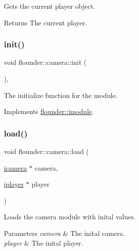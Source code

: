 Gets the current player object. 

\begin{DoxyReturn}{Returns}
The current player. 
\end{DoxyReturn}
\mbox{\label{classflounder_1_1camera_a3deb0358c2a67ad864a630adaf566c4e}} 
\subsubsection{\texorpdfstring{init()}{init()}}
{\footnotesize\ttfamily void flounder\+::camera\+::init (\begin{DoxyParamCaption}{ }\end{DoxyParamCaption})\hspace{0.3cm}{\ttfamily [override]}, {\ttfamily [virtual]}}



The initialize function for the module. 



Implements \hyperlink{classflounder_1_1imodule_a1725ef346952884d0741de61aba1e0c7}{flounder\+::imodule}.

\mbox{\label{classflounder_1_1camera_a430059bcefcaa3ad93b719ae64cd95ca}} 
\subsubsection{\texorpdfstring{load()}{load()}}
{\footnotesize\ttfamily void flounder\+::camera\+::load (\begin{DoxyParamCaption}\item[{\hyperlink{classflounder_1_1icamera}{icamera} $\ast$}]{camera,  }\item[{\hyperlink{classflounder_1_1iplayer}{iplayer} $\ast$}]{player }\end{DoxyParamCaption})}



Loads the camera module with inital values. 


\begin{DoxyParams}{Parameters}
{\em camera} & The inital camera. \\
\hline
{\em player} & The inital player. \\
\hline
\end{DoxyParams}
\mbox{\label{classflounder_1_1camera_a43117513a5beffafb902448843206a79}} 
